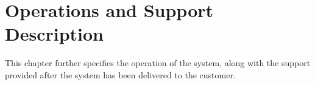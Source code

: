 \chapter{Operations and Support Description}
This chapter further specifies the operation of the system, along with the support provided after the system has been delivered to the customer.
%


